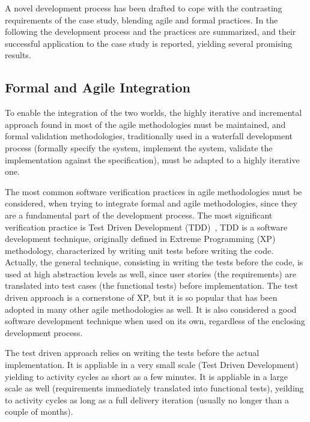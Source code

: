 \documentclass{article}
\begin{document}
A novel development process has been drafted to cope with the contrasting requirements of the case study, blending agile and formal practices.  
In the following the development process and the practices are summarized, and their successful application to the case study is reported, yielding several promising results.



\subsection{Formal and Agile Integration}
\label{subsec:formal_and_agile_integration}

To enable the integration of the two worlds, the highly iterative and incremental approach found in most of the agile methodologies must be maintained, and formal validation  methodologies, traditionally used in a waterfall development process (formally specify the system, implement the system, validate the implementation against the specification), must be adapted to a highly iterative one.

The most common software verification practices in agile methodologies must be considered, when trying to integrate formal and agile methodologies, since they are a fundamental part of the development process. 
The most significant verification practice is Test Driven Development (TDD)~\cite{Beck2003}, TDD is a software development technique, originally defined in Extreme Programming (XP)~\cite{Beck2004} methodology, characterized by writing unit tests before writing the code.
Actually, the general technique, consisting in writing the tests before the code, is used at high abstraction levels as well, since user stories (the requirements) are translated into test cases (the functional tests) before implementation.
The test driven approach is a cornerstone of XP, but it is so popular that has been adopted in many other agile methodologies as well.
It is also considered a good software development technique when used on its own, regardless of the enclosing development process.

The test driven approach relies on writing the tests before the actual implementation. 
It is appliable in a very small scale (Test Driven Development) yielding to activity cycles as short as a few minutes.
It is appliable in a large scale as well (requirements immediately translated into functional tests), yeilding to activity cycles as long as a full delivery iteration (usually no longer than a couple of months).
\end{document}

